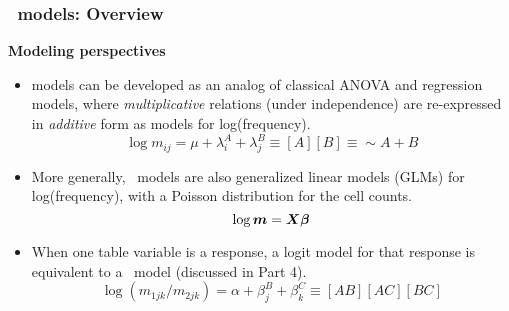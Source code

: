 \renewcommand{\FileName}{loglin}
\begin{frame}
  \frametitle{\Loglin\  models: Overview}
  \begin{block}{\large\bfseries Modeling perspectives}
      \begin{itemize}[<+->]
	    \item \alert{\Loglin} models can be developed as an analog of classical ANOVA and regression
		models, where \emph{multiplicative} relations (under independence) are re-expressed in \emph{additive}
		form as models for log(frequency).
          \begin{equation*}
          	 	\log m_{ij} = \mu + \lambda_i^A + \lambda_j^B 	\equiv [A] [B] \equiv \sim A + B
          \end{equation*}

		\item More generally, \loglin\ models are also \alert{generalized linear models}
        (GLMs) 
		for log(frequency), with a Poisson distribution for the cell counts.
			\[ \log \bm{m} = \bm{X}  \bm{\beta}\]

		\item When one table variable is a response, a \alert{logit model} for that response is equivalent
		to a \loglin\ model (discussed in Part 4).
          \begin{equation*}
          	 	\log (m_{1jk}/m_{2jk}) = \alpha + \beta_j^B + \beta_k^C	\equiv [AB] [AC] [BC]
          \end{equation*}
      \end{itemize}
  \end{block}
\end{frame}
	

